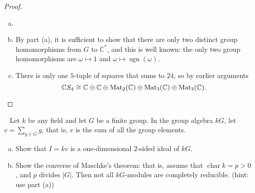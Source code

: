 \documentclass{article}
\begin{document}
\begin{proof} ~
  \begin{enumerate}[(a)]
    \item
    \item By part (a), it is sufficient to show that there are only two
    distinct group homomorphisms from $G$ to $\mathbb C^*$, and this is well
    known: the only two group homomorphisms are
    $\omega \mapsto 1$ and $\omega \mapsto \operatorname{sgn}(\omega)$.
    \item There is only one $5$-tuple of squares that sums to $24$, so by
    earlier arguments \[
      \mathbb C S_4
      \cong \mathbb C
      \oplus \mathbb C
      \oplus \operatorname{Mat}_2(\mathbb C)
      \oplus \operatorname{Mat}_3(\mathbb C)
      \oplus \operatorname{Mat}_3(\mathbb C).
    \]
  \end{enumerate}
\end{proof}
\pagebreak
\begin{problem}{2} ~
  Let $k$ be any field and let $G$ be a finite group. In the group algebra
  $kG$, let $v = \sum_{g \in G} g$, that is, $v$ is the sum of all the group elements.
  \begin{enumerate}[(a)]
    \item Show that $I = k v$ is a one-dimensional 2-sided ideal of $kG$.
    \item Show the converse of Maschke's theorem: that is, assume
      that $\operatorname{char} k = p > 0$, and $p$ divides $|G|$. Then not all
      $kG$-modules are completely reducible. (hint: use part (a))
  \end{enumerate}
\end{problem}
\end{document}
